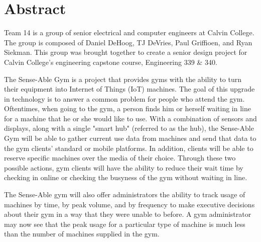 \documentclass[PPFS.tex]{template/subfiles}
\begin{document}
\section*{Abstract}

Team 14 is a group of senior electrical and computer engineers at Calvin College. The group is composed of Daniel DeHoog, TJ DeVries, Paul Griffioen, and Ryan Siekman. This group was brought together to create a senior design project for Calvin College's engineering capstone course, Engineering 339 \& 340.

The Sense-Able Gym is a project that provides gyms with the ability to turn their equipment into Internet of Things (IoT) machines. The goal of this upgrade in technology is to answer a common problem for people who attend the gym. Oftentimes, when going to the gym, a person finds him or herself waiting in line for a machine that he or she would like to use.  With a combination of sensors and displays, along with a single
"smart hub" (referred to as the hub), the Sense-Able Gym will be able to gather current use data from machines and send that data to the gym clients' standard or mobile platforms. In addition, clients will be able to reserve specific machines over the media of their choice. Through these two possible actions, gym clients will have the ability to reduce their wait time by checking in online or checking the busyness of the gym without waiting in line.

The Sense-Able gym will also offer administrators the ability to track usage of machines by time, by peak volume, and by frequency to make executive decisions about their gym in a way that they were unable to before. A gym administrator may now see that the peak usage for a particular type of machine is much less than the number of machines supplied in the gym.
\end{document}
